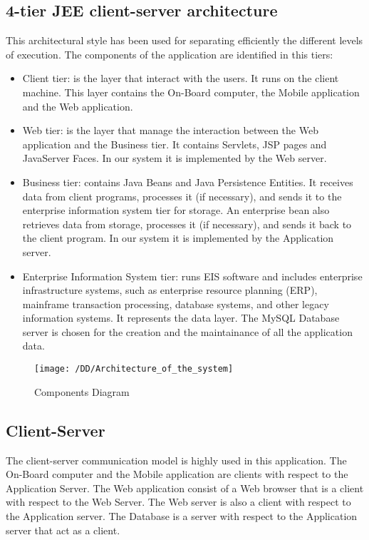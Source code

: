 \subsection{4-tier JEE client-server architecture}
	This architectural style has been used for separating efficiently the different levels of execution. The components of the application are identified in this tiers:
	\begin{itemize}
		\item{Client tier: is the layer that interact with the users. It runs on the client machine. This layer contains the On-Board computer, the Mobile application and the Web application.}
		\item{Web tier: is the layer that manage the interaction between the Web application and the Business tier. It contains Servlets, JSP pages and JavaServer Faces. In our system it is implemented by the Web server.}%
		\item{Business tier: contains Java Beans and Java Persistence Entities. It receives data from client programs, processes it (if necessary), and sends it to the enterprise information system tier for storage. An enterprise bean also retrieves data from storage, processes it (if necessary), and sends it back to the client program. In our system it is implemented by the Application server.}
		\item{Enterprise Information System tier: runs EIS software and includes enterprise infrastructure systems, such as enterprise resource planning (ERP), mainframe transaction processing, database systems, and other legacy information systems. It represents the data layer. The MySQL Database server is chosen for the creation and the maintainance of all the application data.}
	\end{itemize}
	\begin{figure}[!h]
  \centering
  \vspace{0.2cm}
  \texttt{[image: /DD/Architecture\_of\_the\_system]}\\
  \vspace{0.4cm}
  \caption{Components Diagram} 
  \label{fig:Architecture of the system} 
\end{figure}
\subsection{Client-Server}
	The client-server communication model is highly used in this application.
	The On-Board computer and the Mobile application are clients with respect to the Application Server. The Web application consist of a Web browser that is a client with respect to the Web Server. The Web server is also a client with respect to the Application server. The Database is a server with respect to the Application server that act as a client.
